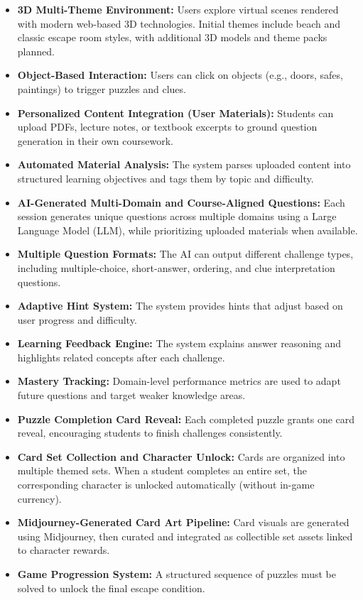 \documentclass[12pt]{article}
\begin{document}
\begin{itemize}
    \item \textbf{3D Multi-Theme Environment:} Users explore virtual scenes rendered with modern web-based 3D technologies. Initial themes include beach and classic escape room styles, with additional 3D models and theme packs planned.
    
    \item \textbf{Object-Based Interaction:} Users can click on objects (e.g., doors, safes, paintings) to trigger puzzles and clues.
    
    \item \textbf{Personalized Content Integration (User Materials):} Students can upload PDFs, lecture notes, or textbook excerpts to ground question generation in their own coursework.

    \item \textbf{Automated Material Analysis:} The system parses uploaded content into structured learning objectives and tags them by topic and difficulty.

    \item \textbf{AI-Generated Multi-Domain and Course-Aligned Questions:} Each session generates unique questions across multiple domains using a Large Language Model (LLM), while prioritizing uploaded materials when available.

    \item \textbf{Multiple Question Formats:} The AI can output different challenge types, including multiple-choice, short-answer, ordering, and clue interpretation questions.
    
    \item \textbf{Adaptive Hint System:} The system provides hints that adjust based on user progress and difficulty.

    \item \textbf{Learning Feedback Engine:} The system explains answer reasoning and highlights related concepts after each challenge.

    \item \textbf{Mastery Tracking:} Domain-level performance metrics are used to adapt future questions and target weaker knowledge areas.

    \item \textbf{Puzzle Completion Card Reveal:} Each completed puzzle grants one card reveal, encouraging students to finish challenges consistently.

    \item \textbf{Card Set Collection and Character Unlock:} Cards are organized into multiple themed sets. When a student completes an entire set, the corresponding character is unlocked automatically (without in-game currency).

    \item \textbf{Midjourney-Generated Card Art Pipeline:} Card visuals are generated using Midjourney, then curated and integrated as collectible set assets linked to character rewards.
    
    \item \textbf{Game Progression System:} A structured sequence of puzzles must be solved to unlock the final escape condition.
\end{itemize}
\end{document}
